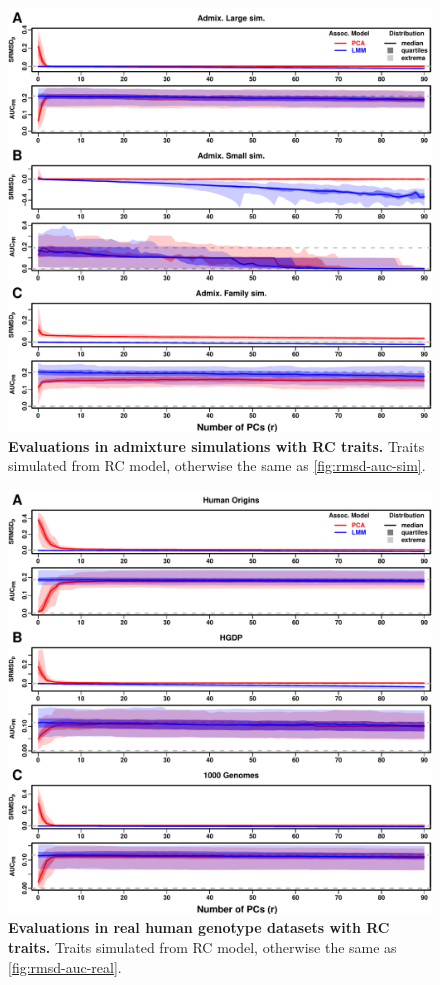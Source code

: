 \documentclass[11pt]{article}
\begin{document}
\begin{figure}[hp!]
  \centering
  \includegraphics[width=\textwidth,height=\textheight,keepaspectratio]{rmsd-auc-sim.pdf}
  \caption{
    {\bf Evaluations in admixture simulations with RC traits.}
    Traits simulated from RC model, otherwise the same as \cref{fig:rmsd-auc-sim}.
  }
  \label{fig:rmsd-auc-sim-rc}
\end{figure}

\begin{figure}[hp!]
  \centering
  \includegraphics[width=\textwidth,height=\textheight,keepaspectratio]{rmsd-auc-real.pdf}
  \caption{
    {\bf Evaluations in real human genotype datasets with RC traits.}
    Traits simulated from RC model, otherwise the same as \cref{fig:rmsd-auc-real}.
  }
  \label{fig:rmsd-auc-real-rc}
\end{figure}
\end{document}
